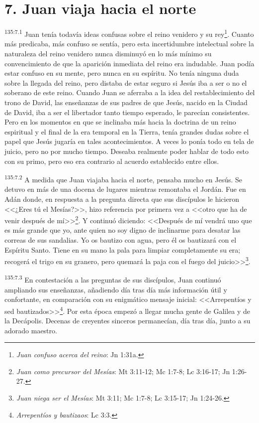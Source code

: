 \section*{7. Juan viaja hacia el norte}
\par 
\textsuperscript{135:7.1} Juan tenía todavía ideas confusas sobre el reino venidero y su rey\footnote{\textit{Juan confuso acerca del reino}: Jn 1:31a.}. Cuanto más predicaba, más confuso se sentía, pero esta incertidumbre intelectual sobre la naturaleza del reino venidero nunca disminuyó en lo más mínimo su convencimiento de que la aparición inmediata del reino era indudable. Juan podía estar confuso en su mente, pero nunca en su espíritu. No tenía ninguna duda sobre la llegada del reino, pero distaba de estar seguro si Jesús iba a ser o no el soberano de este reino. Cuando Juan se aferraba a la idea del restablecimiento del trono de David, las enseñanzas de sus padres de que Jesús, nacido en la Ciudad de David, iba a ser el libertador tanto tiempo esperado, le parecían consistentes. Pero en los momentos en que se inclinaba más hacia la doctrina de un reino espiritual y el final de la era temporal en la Tierra, tenía grandes dudas sobre el papel que Jesús jugaría en tales acontecimientos. A veces lo ponía todo en tela de juicio, pero no por mucho tiempo. Deseaba realmente poder hablar de todo esto con su primo, pero eso era contrario al acuerdo establecido entre ellos.

\par 
\textsuperscript{135:7.2} A medida que Juan viajaba hacia el norte, pensaba mucho en Jesús. Se detuvo en más de una docena de lugares mientras remontaba el Jordán. Fue en Adán donde, en respuesta a la pregunta directa que sus discípulos le hicieron <<¿Eres tú el Mesías?>>, hizo referencia por primera vez a <<otro que ha de venir después de mí>>\footnote{\textit{Juan como precursor del Mesías}: Mt 3:11-12; Mc 1:7-8; Lc 3:16-17; Jn 1:26-27.}. Y continuó diciendo: <<Después de mí vendrá uno que es más grande que yo, ante quien no soy digno de inclinarme para desatar las correas de sus sandalias. Yo os bautizo con agua, pero él os bautizará con el Espíritu Santo. Tiene en su mano la pala para limpiar completamente su era; recogerá el trigo en su granero, pero quemará la paja con el fuego del juicio>>\footnote{\textit{Juan niega ser el Mesías}: Mt 3:11; Mc 1:7-8; Lc 3:15-17; Jn 1:24-26.}.

\par 
\textsuperscript{135:7.3} En contestación a las preguntas de sus discípulos, Juan continuó ampliando sus enseñanzas, añadiendo día tras día más información útil y confortante, en comparación con su enigmático mensaje inicial: <<Arrepentíos y sed bautizados>>\footnote{\textit{Arrepentíos y bautizaos}: Lc 3:3.}. Por esta época empezó a llegar mucha gente de Galilea y de la Decápolis. Decenas de creyentes sinceros permanecían, día tras día, junto a su adorado maestro.


